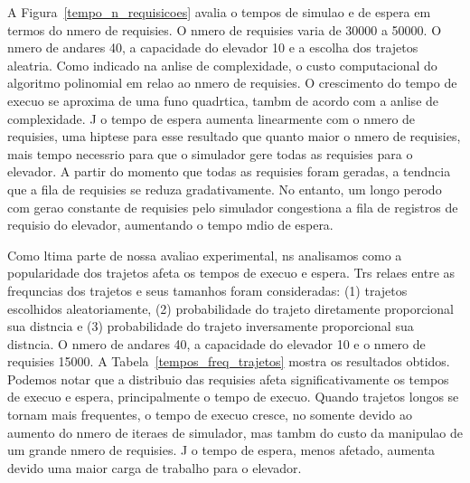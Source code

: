 \documentclass[12pt]{article}
\begin{document}
A Figura~\ref{tempo_n_requisicoes} avalia o tempos de simulao e de espera em termos do nmero de requisies. O nmero de requisies varia de 30000 a 50000. O nmero de andares  40, a capacidade do elevador  10 e a escolha dos trajetos  aleatria. Como indicado na anlise de complexidade, o custo computacional do algoritmo  polinomial em relao ao nmero de requisies. O crescimento do tempo de execuo se aproxima de uma funo quadrtica, tambm de acordo com a anlise de complexidade. J o tempo de espera aumenta linearmente com o nmero de requisies, uma hiptese para esse resultado  que quanto maior o nmero de requisies, mais tempo  necessrio para que o simulador gere todas as requisies para o elevador. A partir do momento que todas as requisies foram geradas, a tendncia  que a fila de requisies se reduza gradativamente. No entanto, um longo perodo com gerao constante de requisies pelo simulador congestiona a fila de registros de requisio do elevador, aumentando o tempo mdio de espera.


Como ltima parte de nossa avaliao experimental, ns analisamos como a popularidade dos trajetos afeta os tempos de execuo e espera. Trs relaes entre as frequncias dos trajetos e seus tamanhos foram consideradas: (1) trajetos escolhidos aleatoriamente, (2) probabilidade do trajeto diretamente proporcional  sua distncia e (3) probabilidade do trajeto inversamente proporcional  sua distncia. O nmero de andares  40, a capacidade do elevador  10 e o nmero de requisies  15000. A Tabela~\ref{tempos_freq_trajetos} mostra os resultados obtidos. Podemos notar que a distribuio das requisies afeta significativamente os tempos de execuo e espera, principalmente o tempo de execuo. Quando trajetos longos se tornam mais frequentes, o tempo de execuo cresce, no somente devido ao aumento do nmero de iteraes de simulador, mas tambm do custo da manipulao de um grande nmero de requisies. J o tempo de espera, menos afetado, aumenta devido  uma maior carga de trabalho para o elevador.
\end{document}
